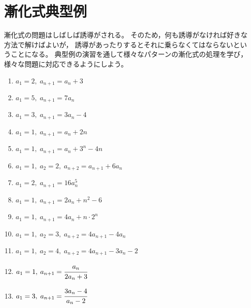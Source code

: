 \documentclass[autodetect-engine,ja=standard, 10.5pt, a4paper, titlepage]{bxjsarticle}
\begin{document}
\clearpage
\section*{漸化式\:\:典型例}
漸化式の問題はしばしば誘導がされる。
そのため，何も誘導がなければ好きな方法で解けばよいが，
誘導があったりするとそれに乗らなくてはならないということになる。
典型例の演習を通して様々なパターンの漸化式の処理を学び，
様々な問題に対応できるようにしよう。
\begin{enumerate}[1.]

  \item $a_1 = 2,\; a_{n+1} = a_n + 3$\\

  \item $a_1 = 5,\; a_{n+1} = 7a_n$\\

  \item $a_1 = 3,\; a_{n+1} = 3a_n -4$\\

  \item $a_1 = 1,\; a_{n+1} = a_n + 2n$\\

  \item $a_1 = 1,\; a_{n+1} = a_n + 3^n - 4n$\\

  \item $a_1 = 1,\; a_2 = 2,\; a_{n+2} = a_{n+1} + 6a_n$\\

  \item $a_1 = 2,\; a_{n+1} = 16a_n^5$\\

  \item $a_1 = 1,\; a_{n+1} = 2a_n + n^2 -6$\\

  \item $a_1 = 1,\; a_{n+1} = 4a_n + n\cdot 2^n$\\

  \item $a_1 = 1,\; a_2 = 3,\; a_{n+2} = 4a_{n+1} - 4a_n$\\

  \item $a_1 = 1,\; a_2 = 4,\; a_{n+2} = 4a_{n+1} - 3a_n - 2$\\

  \item $a_1 = 1,\: a_{n+1} = \cfrac{a_n}{2a_n + 3}$\\

  \item $a_1 = 3,\; a_{n+1} = \cfrac{3a_n-4}{a_n-2}$\\


\end{enumerate}
\end{document}
